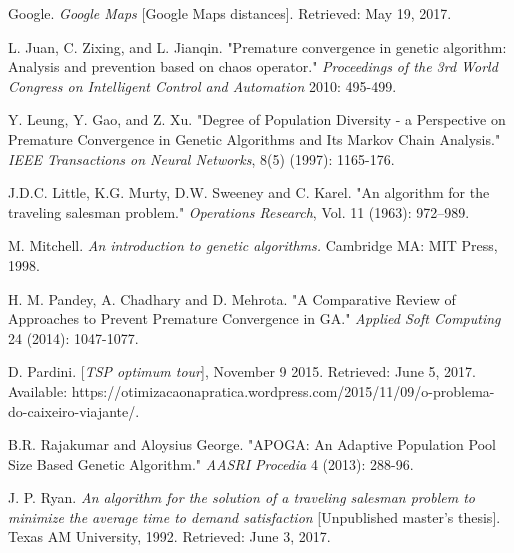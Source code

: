 \begin{thebibliography}{9}
Google.
\textit{Google Maps} [Google Maps distances].
Retrieved: May 19, 2017.

L. Juan, C. Zixing, and L. Jianqin.
"Premature convergence in genetic algorithm: Analysis and prevention based on chaos operator."
\textit{Proceedings of the 3rd World Congress on Intelligent Control and Automation} 2010: 495-499.

Y. Leung, Y. Gao, and Z. Xu.
"Degree of Population Diversity - a Perspective on Premature Convergence in Genetic Algorithms and Its Markov Chain Analysis." \textit{IEEE Transactions on Neural Networks}, 8(5) (1997): 1165-176. 

J.D.C. Little, K.G. Murty, D.W. Sweeney and C. Karel. "An algorithm for the traveling salesman problem." \textit{Operations Research}, Vol. 11 (1963): 972–989.

M. Mitchell.
\textit{ An introduction to genetic algorithms.} Cambridge MA: MIT Press, 1998.

H. M. Pandey, A. Chadhary and D. Mehrota.
"A Comparative Review of Approaches to Prevent Premature Convergence in GA." \textit{Applied Soft Computing} 24 (2014): 1047-1077. 

D. Pardini.
[\textit{TSP optimum tour}], November 9 2015. Retrieved: June 5, 2017. Available: https://otimizacaonapratica.wordpress.com/2015/11/09/o-problema-do-caixeiro-viajante/.

B.R. Rajakumar and Aloysius George. "APOGA: An Adaptive Population Pool Size Based Genetic Algorithm." \textit{AASRI Procedia} 4 (2013): 288-96.

J. P. Ryan.
\textit{An algorithm for the solution of a traveling salesman problem to minimize the average time to demand satisfaction} [Unpublished master's thesis]. Texas AM University, 1992. Retrieved: June 3, 2017.
\end{thebibliography}


